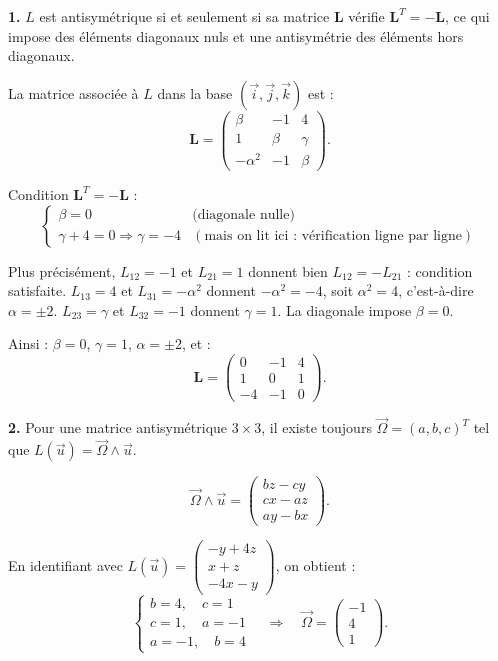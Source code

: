 \documentclass[12pt,a4paper]{article}
\begin{document}
\begin{boitecorrige}
\textbf{1.} $L$ est antisymétrique si et seulement si sa matrice $\mathbf{L}$ vérifie $\mathbf{L}^T = -\mathbf{L}$, ce qui impose des éléments diagonaux nuls et une antisymétrie des éléments hors diagonaux.

La matrice associée à $L$ dans la base $(\vec{i}, \vec{j}, \vec{k})$ est :
\[
\mathbf{L} = \begin{pmatrix} \beta & -1 & 4 \\ 1 & \beta & \gamma \\ -\alpha^2 & -1 & \beta \end{pmatrix}.
\]

Condition $\mathbf{L}^T = -\mathbf{L}$ :
\[
\begin{cases} \beta = 0 & \text{(diagonale nulle)} \\ \gamma + 4 = 0 \Rightarrow \gamma = -4 & (\text{mais on lit ici : vérification ligne par ligne}) \end{cases}
\]

Plus précisément, $L_{12} = -1$ et $L_{21} = 1$ donnent bien $L_{12} = -L_{21}$ : condition satisfaite. $L_{13} = 4$ et $L_{31} = -\alpha^2$ donnent $-\alpha^2 = -4$, soit $\alpha^2 = 4$, c'est-à-dire $\alpha = \pm 2$. $L_{23} = \gamma$ et $L_{32} = -1$ donnent $\gamma = 1$. La diagonale impose $\beta = 0$.

Ainsi : $\beta = 0$, $\gamma = 1$, $\alpha = \pm 2$, et :
\[
\mathbf{L} = \begin{pmatrix} 0 & -1 & 4 \\ 1 & 0 & 1 \\ -4 & -1 & 0 \end{pmatrix}.
\]

\textbf{2.} Pour une matrice antisymétrique $3 \times 3$, il existe toujours $\vec{\Omega} = (a, b, c)^T$ tel que $L(\vec{u}) = \vec{\Omega} \wedge \vec{u}$.

\[
\vec{\Omega} \wedge \vec{u} = \begin{pmatrix} bz - cy \\ cx - az \\ ay - bx \end{pmatrix}.
\]

En identifiant avec $L(\vec{u}) = \begin{pmatrix} -y + 4z \\ x + z \\ -4x - y \end{pmatrix}$, on obtient :
\[
\begin{cases} b = 4, \quad c = 1 \\ c = 1, \quad a = -1 \\ a = -1, \quad b = 4 \end{cases}
\quad \Rightarrow \quad \vec{\Omega} = \begin{pmatrix} -1 \\ 4 \\ 1 \end{pmatrix}.
\]


\end{boitecorrige}
\end{document}
